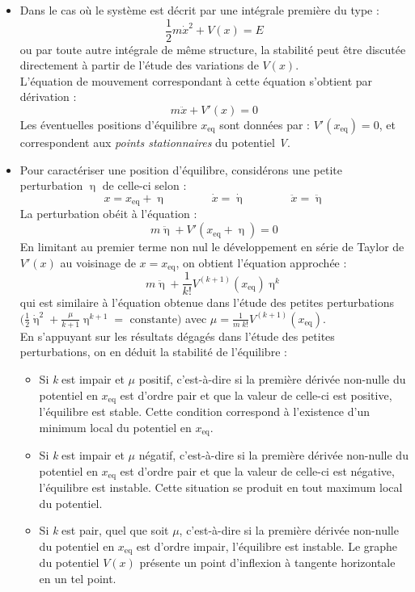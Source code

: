 \documentclass[a4paper]{article}
\begin{document}
\begin{itemize}
\item Dans le cas où le système est décrit par une intégrale première du type : 
\[ \frac{1}{2} m \dot{x}^2 + V(x) = E \]
ou par toute autre intégrale de même structure, la stabilité peut être discutée directement à partir de l'étude des variations de $ V(x) $. \\
L'équation de mouvement correspondant à cette équation s'obtient par dérivation : 
\[ m \ddot{x} + V'(x) = 0 \]
Les éventuelles positions d'équilibre $ x_{\text{eq}} $ sont données par : $ V'(x_{\text{eq}}) = 0 $, et correspondent aux \emph{points stationnaires} du potentiel \emph{V}.





\item Pour caractériser une position d'équilibre, considérons une petite perturbation $ \upeta $ de celle-ci selon : 
\[ x = x_{\text{eq}} + \upeta \qquad \qquad \dot{x} = \dot{\upeta} \qquad \qquad \ddot{x} = \ddot{\upeta} \]
La perturbation obéit à l'équation : 
\[ m \ddot{\upeta} + V'(x_{\text{eq}} + \upeta) = 0 \]
En limitant au premier terme non nul le développement en série de Taylor de $ V'(x) $ au voisinage de $ x = x_{\text{eq}} $, on obtient l'équation approchée : 
\[ m \ddot{\upeta} + \frac{1}{k !} V^{(k+1)} (x_{\text{eq}}) \upeta^k \]
qui est similaire à l'équation obtenue dans l'étude des petites perturbations $\displaystyle \Big( \frac{1}{2} \dot{\upeta}^2 + \frac{\mu}{k + 1} \upeta^{k + 1} = \text{ constante} \Big) $ avec $\displaystyle \mu = \frac{1}{m \; k !} V^{(k + 1)} (x_{\text{eq}}) $. \\
En s'appuyant sur les résultats dégagés dans l'étude des petites perturbations, on en déduit la stabilité de l'équilibre : 
\begin{itemize}
\item Si \emph{k} est impair et $ \mu $ positif, c'est-à-dire si la première dérivée non-nulle du potentiel en $ x_{\text{eq}} $ est d'ordre pair et que la valeur de celle-ci est positive, l'équilibre est stable. Cette condition correspond à l'existence d'un minimum local du potentiel en $ x_{\text{eq}} $.
\item Si \emph{k} est impair et $ \mu $ négatif, c'est-à-dire si la première dérivée non-nulle du potentiel en $ x_{\text{eq}} $ est d'ordre pair et que la valeur de celle-ci est négative, l'équilibre est instable. Cette situation se produit en tout maximum local du potentiel.
\item Si \emph{k} est pair, quel que soit $ \mu $, c'est-à-dire si la première dérivée non-nulle du potentiel en $ x_{\text{eq}} $ est d'ordre impair, l'équilibre est instable. Le graphe du potentiel $ V(x) $ présente un point d'inflexion à tangente horizontale en un tel point.
\end{itemize}






\end{itemize}
\end{document}
